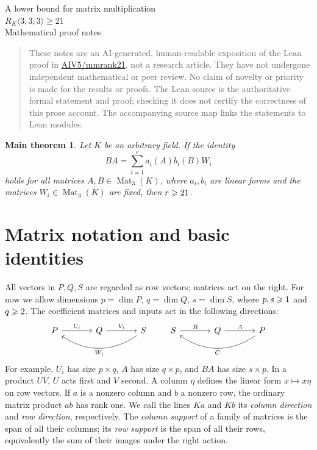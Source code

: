 \documentclass[11pt,a4paper]{article}
\numberwithin{equation}{section}
\theoremstyle{plain}
\newtheorem*{maintheorem}{Main theorem}
\theoremstyle{definition}
\DeclareMathOperator{\Mat}{Mat}\DeclareMathOperator{\Span}{span}
\begin{document}
\begin{center}
{\LARGE A lower bound for matrix multiplication}\\[6pt]
{\Large $R_K\langle3,3,3\rangle\geqslant21$}\\[8pt]
{\normalsize Mathematical proof notes}
\end{center}
\begin{quote}\small
These notes are an AI-generated, human-readable exposition of the Lean
proof in \href{https://github.com/AIV5/mmrank21}{AIV5/mmrank21}, not a
research article. They have not undergone independent mathematical or
peer review. No claim of novelty or priority is made for the results
or proofs. The Lean source is the authoritative formal statement and
proof; checking it does not certify the correctness of this prose account.
The accompanying source map links the statements to Lean modules.
\end{quote}
\begin{maintheorem}
Let $K$ be an arbitrary field. If the identity
\[
 BA=\sum_{i=1}^{r} a_i(A)b_i(B)W_i
\]
holds for all matrices $A,B\in\Mat_3(K)$, where $a_i,b_i$ are linear
forms and the matrices $W_i\in\Mat_3(K)$ are fixed, then $r\geqslant21$.
\end{maintheorem}

\tableofcontents
\newpage
\section{Matrix notation and basic identities}

All vectors in $P,Q,S$ are regarded as row vectors; matrices act on the
right. For now we allow dimensions $p=\dim P$, $q=\dim Q$, $s=\dim S$,
where $p,s\geqslant1$ and $q\geqslant2$.
The coefficient matrices and inputs act in the following directions:
\[
\begin{tikzcd}[column sep=large]
 P\arrow[r,"U_i"] & Q\arrow[r,"V_i"] & S\arrow[ll,bend left=35,"W_i"]
\end{tikzcd}
\qquad
\begin{tikzcd}[column sep=large]
 S\arrow[r,"B"]&Q\arrow[r,"A"]&P\arrow[ll,bend left=35,"C"]
\end{tikzcd}
\]
For example, $U_i$ has size $p\times q$, $A$ has size $q\times p$,
and $BA$ has size $s\times p$. In a product $UV$, $U$ acts first and
$V$ second. A column $\eta$ defines the linear form $x\mapsto x\eta$
on row vectors. If $a$ is a nonzero column and $b$ a nonzero row,
the ordinary matrix product $ab$ has rank one.
We call the lines $Ka$ and $Kb$ its \emph{column direction} and
\emph{row direction}, respectively.
The \emph{column support} of a family of matrices is the span of all
their columns; its \emph{row support} is the span of all their rows,
equivalently the sum of their images under the right action.
\end{document}
